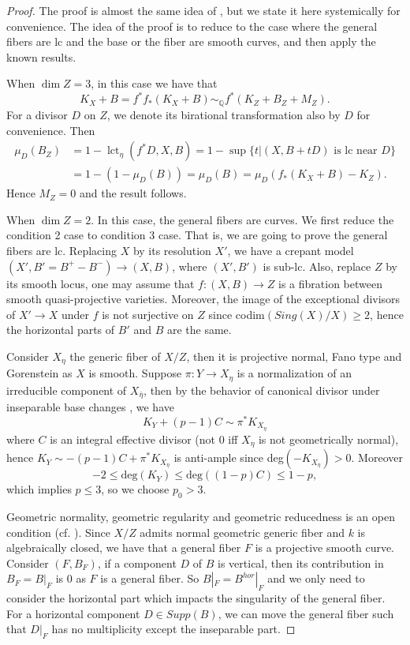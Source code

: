 \documentclass[letterpaper,reqno,12pt]{amsart}
\DeclareMathOperator{\lct}{lct}
\numberwithin{equation}{section}
\theoremstyle{plain}
\begin{document}
\begin{proof}
    The proof is almost the same idea of \cite[3.3]{jxtcbf}, but we state it here systemically for convenience. The idea of the proof is to reduce to the case where the general fibers are lc and the base or the fiber are smooth curves, and then apply the known results.

    When $\dim Z=3$, in this case we have that \[K_X+B=f^*f_*(K_X+B)\sim_{\mathbb Q} f^*(K_Z+B_Z+M_Z).\] For a divisor $D$ on $Z$, we denote its birational transformation also by $D$ for convenience. Then
    \[
    \begin{aligned}
        \mu_D(B_Z)&=1-\lct_\eta(f^*D,X,B)=1-\sup\{t|(X,B+tD)\text{ is lc near $D$}\}\\&=1-(1-\mu_D(B))=\mu_D(B)=\mu_D(f_*(K_X+B)-K_Z).
    \end{aligned}\]
    Hence $M_Z=0$ and the result follows.
    
    When $\dim Z=2$. In this case, the general fibers are curves. We first reduce the condition 2 case to condition 3 case. That is, we are going to prove the general fibers are lc. Replacing $X$ by its resolution $X'$, we have a crepant model $(X',B'=B^+-B^-)\to (X,B)$, where $(X',B')$ is sub-lc. Also, replace $Z$ by its smooth locus, one may assume that $f:(X,B)\to Z$ is a fibration between smooth quasi-projective varieties. Moreover, the image of the exceptional divisors of $X'\to X$ under $f$ is not surjective on $Z$ since codim$(Sing(X)/X)\geq 2$, hence the horizontal parts of $B'$ and $B$ are the same.
        
    Consider $X_\eta$ the generic fiber of $X/Z$, then it is projective normal, Fano type and Gorenstein as $X$ is smooth. Suppose $\pi:Y\to X_\eta$ is a normalization of an irreducible component of $X_{\bar\eta}$, then by the behavior of canonical divisor under inseparable base changes \cite[1.1]{patakfalvi2018singularitiesgeneralfiberslmmp}, we have \[K_Y+(p-1)C\sim\pi^*K_{X_\eta}\] where $C$ is an integral effective divisor (not 0 iff $X_\eta$ is not geometrically normal), hence $K_Y\sim-(p-1)C+\pi^*K_{X_\eta}$ is anti-ample since deg$(-K_{X_\eta})>0$. Moreover \[-2\leq\text{deg}(K_Y)\leq\text{deg}((1-p)C)\leq 1-p,\] which implies $p\leq 3$, so we choose $p_0>3$.

    Geometric normality, geometric regularity and geometric reducedness is an open condition (cf. \cite[II.6.9.1 and III.12.1.1]{PMIHES_1967__32__5_0}). Since $X/Z$ admits normal geometric generic fiber and $k$ is algebraically closed, we have that a general fiber $F$ is a projective smooth curve. Consider $(F,B_F)$, if a component $D$ of $B$ is vertical, then its contribution in $B_F=B|_F$ is $0$ as $F$ is a general fiber. So $B|_F=B^{hor}|_F$ and we only need to consider the horizontal part which impacts the singularity of the general fiber. For a horizontal component $D\in Supp(B)$, we can move the general fiber such that $D|_F$ has no multiplicity except the inseparable part.
        

\end{proof}
\end{document}
